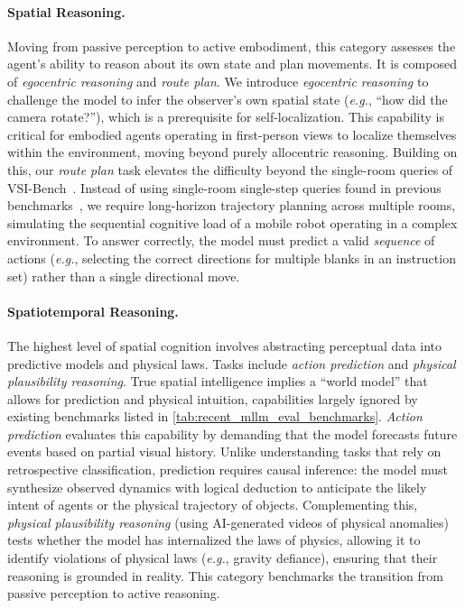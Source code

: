 \documentclass{article}
\newcommand{\eg}{\textit{e.g.}}
\begin{document}
\paragraph{Spatial Reasoning.} Moving from passive perception to active embodiment, this category assesses the agent's ability to reason about its own state and plan movements.
It is composed of \textit{egocentric reasoning} and \textit{route plan}.
We introduce \textit{egocentric reasoning} to challenge the model to infer the observer's own spatial state (\eg, ``how did the camera rotate?''), which is a prerequisite for self-localization.
This capability is critical for embodied agents operating in first-person views to localize themselves within the environment, moving beyond purely allocentric reasoning.
Building on this, our \textit{route plan} task elevates the difficulty beyond the single-room queries of VSI-Bench~\cite{Yang_2025_CVPR}.
Instead of using single-room single-step queries found in previous benchmarks~\cite{Yang_2025_CVPR}, we require long-horizon trajectory planning across multiple rooms, simulating the sequential cognitive load of a mobile robot operating in a complex environment.
To answer correctly, the model must predict a valid \textit{sequence} of actions (\eg, selecting the correct directions for multiple blanks in an instruction set) rather than a single directional move.

\paragraph{Spatiotemporal Reasoning.}
The highest level of spatial cognition involves abstracting perceptual data into predictive models and physical laws.
Tasks include \textit{action prediction} and \textit{physical plausibility reasoning}.
True spatial intelligence implies a ``world model'' that allows for prediction and physical intuition, capabilities largely ignored by existing benchmarks listed in \cref{tab:recent_mllm_eval_benchmarks}.
\textit{Action prediction} evaluates this capability by demanding that the model forecasts future events based on partial visual history.
Unlike understanding tasks that rely on retrospective classification, prediction requires causal inference: the model must synthesize observed dynamics with logical deduction to anticipate the likely intent of agents or the physical trajectory of objects.
Complementing this, \textit{physical plausibility reasoning} (using AI-generated videos of physical anomalies) tests whether the model has internalized the laws of physics, allowing it to identify violations of physical laws (\eg, gravity defiance), ensuring that their reasoning is grounded in reality.
This category benchmarks the transition from passive perception to active reasoning.
\end{document}
